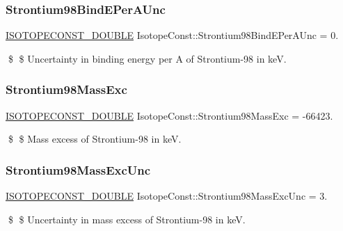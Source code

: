 \subsubsection{\texorpdfstring{Strontium98\+Bind\+E\+Per\+A\+Unc}{Strontium98BindEPerAUnc}}
{\footnotesize\ttfamily \mbox{\hyperlink{group___isotope_const-_macros_ga8f45a7272ce02c0b4c65c44636ed719a}{I\+S\+O\+T\+O\+P\+E\+C\+O\+N\+S\+T\+\_\+\+D\+O\+U\+B\+LE}} Isotope\+Const\+::\+Strontium98\+Bind\+E\+Per\+A\+Unc = 0.}

\$ \$ Uncertainty in binding energy per A of Strontium-\/98 in keV. \mbox{\label{group___isotope_const-_strontium-_sr98_ga87463b41b32ef5f2e0ef25a52d3527c4}} 
\subsubsection{\texorpdfstring{Strontium98\+Mass\+Exc}{Strontium98MassExc}}
{\footnotesize\ttfamily \mbox{\hyperlink{group___isotope_const-_macros_ga8f45a7272ce02c0b4c65c44636ed719a}{I\+S\+O\+T\+O\+P\+E\+C\+O\+N\+S\+T\+\_\+\+D\+O\+U\+B\+LE}} Isotope\+Const\+::\+Strontium98\+Mass\+Exc = -\/66423.}

\$ \$ Mass excess of Strontium-\/98 in keV. \mbox{\label{group___isotope_const-_strontium-_sr98_ga9dec3151c096e3b3cc4a9ab8df440959}} 
\subsubsection{\texorpdfstring{Strontium98\+Mass\+Exc\+Unc}{Strontium98MassExcUnc}}
{\footnotesize\ttfamily \mbox{\hyperlink{group___isotope_const-_macros_ga8f45a7272ce02c0b4c65c44636ed719a}{I\+S\+O\+T\+O\+P\+E\+C\+O\+N\+S\+T\+\_\+\+D\+O\+U\+B\+LE}} Isotope\+Const\+::\+Strontium98\+Mass\+Exc\+Unc = 3.}

\$ \$ Uncertainty in mass excess of Strontium-\/98 in keV. \mbox{\label{group___isotope_const-_strontium-_sr98_ga5e1e50013b9bf4f486841bad0eb68251}} 
